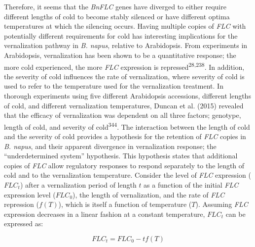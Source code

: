 \documentclass[12pt,]{book}
\begin{document}
Therefore, it seems that the \emph{BnFLC} genes have diverged to either
require different lengths of cold to become stably silenced or have
different optima temperatures at which the silencing occurs. Having
multiple copies of \emph{FLC} with potentially different requirements
for cold has interesting implications for the vernalization pathway in
\emph{B. napus}, relative to Arabidopsis. From experiments in
Arabidopsis, vernalization has been shown to be a quantitative response;
the more cold experienced, the more \emph{FLC} expression is
repressed\textsuperscript{28,238}. In addition, the severity of cold
influences the rate of vernalization, where severity of cold is used to
refer to the temperature used for the vernalization treatment. In
thorough experiments using five different Arabidopsis accessions,
different lengths of cold, and different vernalization temperatures,
Duncan et al. (2015) revealed that the efficacy of vernalization was
dependent on all three factors; genotype, length of cold, and severity
of cold\textsuperscript{344}. The interaction between the length of cold
and the severity of cold provides a hypothesis for the retention of
\emph{FLC} copies in \emph{B. napus}, and their apparent divergence in
vernalization response; the ``underdetermined system'' hypothesis. This
hypothesis states that additional copies of \emph{FLC} allow regulatory
responses to respond separately to the length of cold and to the
vernalization temperature. Consider the level of \emph{FLC} expression
(\(FLC_{t}\)) after a vernalization period of length \(t\) as a function
of the initial \emph{FLC} expression level (\(FLC_{0}\)), the length of
vernalization, and the rate of \emph{FLC} repression (\(f(T)\)), which
is itself a function of temperature (\(T\)). Assuming \emph{FLC}
expression decreases in a linear fashion at a constant temperature,
\(FLC_{t}\) can be expressed as:

\[ FLC_{t} = FLC_{0} - tf(T) \]
\end{document}
